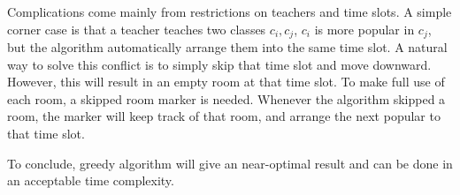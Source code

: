 \documentclass[11pt, oneside]{article}   	%
\begin{document}
\par Complications come mainly from restrictions on teachers and time slots. A simple corner case is that a teacher teaches two classes $c_i,c_j$, $c_i$ is more popular in $c_j$, but the algorithm automatically arrange them into the same time slot. A natural way to solve this conflict is to simply skip that time slot and move downward. However, this will result in an empty room at that time slot. To make full use of each room, a skipped room marker is needed. Whenever the algorithm skipped a room, the marker will keep track of that room, and arrange the next popular to that time slot.
\par To conclude, greedy algorithm will give an near-optimal result and can be done in an acceptable time complexity.
 
\end{document}
